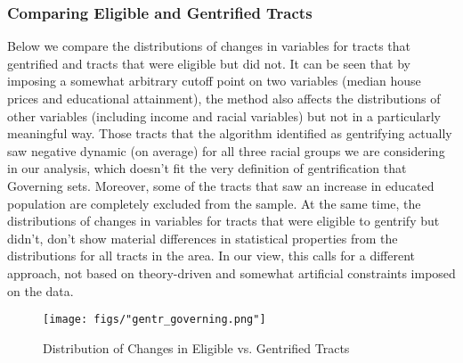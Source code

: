 \documentclass[a4paper, 12pt]{article}
\numberwithin{equation}{section}
\begin{document}
			\subsubsection{Comparing Eligible and Gentrified Tracts}
			Below we compare the distributions of changes in variables for tracts that gentrified and tracts that were eligible but did not. It can be seen that by imposing a somewhat arbitrary cutoff point on two variables (median house prices and educational attainment), the method also affects the distributions of other variables (including income and racial variables) but not in a particularly meaningful way. Those tracts that the algorithm identified as gentrifying actually saw negative dynamic (on average) for all three racial groups we are considering in our analysis, which doesn't fit the very definition of gentrification that Governing sets. Moreover, some of the tracts that saw an increase in educated population are completely excluded from the sample. At the same time, the distributions of changes in variables for tracts that were eligible to gentrify but didn't, don't show material differences in statistical properties from the distributions for all tracts in the area. In our view, this calls for a different approach, not based on theory-driven and somewhat artificial constraints imposed on the data.

			\begin{figure}[H]
				\centering
				\texttt{[image: figs/"gentr\_governing.png"]}
				\caption{Distribution of Changes in  Eligible vs. Gentrified Tracts}
				\label{fig:distr_gov}
			\end{figure}
			
\end{document}
